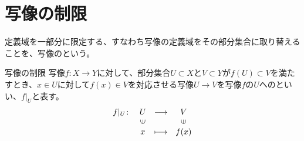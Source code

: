 \documentclass[../../../topic_linear-algebra]{subfiles}
\begin{document}
\sectionline
\section{写像の制限}

定義域を一部分に限定する、すなわち写像の定義域をその部分集合に取り替えることを、写像のという。

\begin{definition}{写像の制限}
  写像$f\colon X \to Y$に対して、部分集合$U \subset X$と$V \subset Y$が$f(U) \subset V$を満たすとき、$x \in U$に対して$f(x) \in V$を対応させる写像$U \to V$を写像$f$の$U$へのといい、$f|_U$と表す。
  \begin{equation*}
  \begin{array}{lclc}
    f|_U \colon & U         & \longrightarrow & V          \\
            & \rotatebox{90}{$\in$} &                 & \rotatebox{90}{$\in$} \\
            & x              & \longmapsto     & f(x)
  \end{array}
\end{equation*}
\end{definition}
\end{document}
